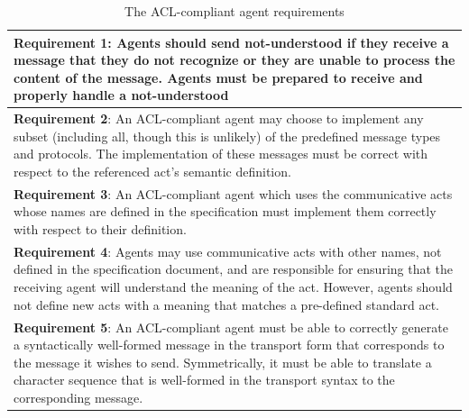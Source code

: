 \documentclass[0main.tex]{subfiles}
\begin{document}
\begin{table}[htbp]
    \caption{The ACL-compliant agent requirements \cite{IntelligentPhysicalAgents2001}}
    \renewcommand{\arraystretch}{1.7}
    \centering\begin{tabular}{p{}}
\toprule
\textbf{Requirement 1}:
Agents should send not-understood if they receive a message that they do not recognize or they are unable to
process the content of the message. Agents must be prepared to receive and properly handle a not-understood
\\ \midrule
\textbf{Requirement 2}:
An ACL-compliant agent may choose to implement any subset (including all, though this is
unlikely) of the predefined message types and protocols. The implementation of these messages
must be correct with respect to the referenced act's semantic definition.
 \\ \midrule
\textbf{Requirement 3}:
An ACL-compliant agent which uses the communicative acts whose names are defined in the specification must
implement them correctly with respect to their definition.
\\ \midrule
\textbf{Requirement 4}:
Agents may use communicative acts with other names, not defined in the specification document,
and are responsible for ensuring that the receiving agent will understand the meaning of the
act. However, agents should not define new acts with a meaning that matches a pre-defined
standard act.
 \\ \midrule
\textbf{Requirement 5}:
An ACL-compliant agent must be able to correctly generate a syntactically well-formed message in the transport
form that corresponds to the message it wishes to send. Symmetrically, it must be able to translate a character
sequence that is well-formed in the transport syntax to the corresponding message.
\\ \bottomrule
    \end{tabular}
    \label{requirements}
\end{table}
\end{document}
